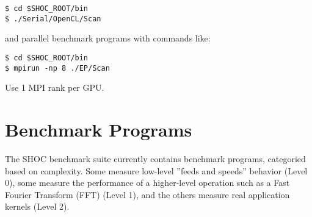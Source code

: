 \documentclass[11pt]{article}
\begin{document}
\begin{Verbatim}[frame=single]
$ cd $SHOC_ROOT/bin
$ ./Serial/OpenCL/Scan 
\end{Verbatim}

and parallel benchmark programs with commands like:

\begin{Verbatim}[frame=single]
$ cd $SHOC_ROOT/bin
$ mpirun -np 8 ./EP/Scan
\end{Verbatim}

Use 1 MPI rank per GPU.  


\section{Benchmark Programs}\label{sec:programs}

The SHOC benchmark suite currently contains benchmark programs, categoried
based on complexity.  Some measure low-level ''feeds and speeds'' behavior
(Level 0), some measure the performance of a higher-level operation such 
as a Fast Fourier Transform (FFT) (Level 1), and the others measure 
real application kernels (Level 2).

\newpage 
\end{document}
